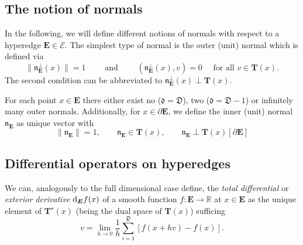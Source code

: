 \documentclass[a4paper, english, 12pt, reqno, draft]{amsart}
\theoremstyle{definition}
\theoremstyle{remark}
\numberwithin{equation}{section}
\newcommand{\SetEdge}{\ensuremath{\boldsymbol{\mathcal E}}}
\newcommand{\Edge}{{\ensuremath{\boldsymbol E}}}
\newcommand{\locDim}{\ensuremath{\mathfrak d}}
\newcommand{\globDim}{\ensuremath{\mathfrak D}}
\newcommand{\Der}{\ensuremath{\textup d_\Edge}}
\newcommand{\tangent}{\ensuremath{{\boldsymbol T}}}
\newcommand{\Normal}{\ensuremath{\mathfrak n_\Edge}}
\newcommand{\NormalOuter}{\ensuremath{\mathfrak n^\perp_\Edge}}
\newcommand{\IR}{\ensuremath{\mathbb R}}
\begin{document}
\subsection{The notion of normals}\label{SEC:normals}
% 
In the following, we will define different notions of normals with respect to a hyperedge $\Edge \in \SetEdge$. The simplest type of normal is the outer (unit) normal which is defined via
% 
\begin{equation*}
 \|\NormalOuter(x)\| = 1 \qquad \text{ and } \qquad (\NormalOuter(x), v) = 0 \quad \text{ for all } v \in \tangent(x).
\end{equation*}
% 
The second condition can be abbreviated to $\NormalOuter(x) \perp \tangent(x)$.

For each point $x \in \Edge$ there either exist no ($\locDim = \globDim$), two ($\locDim = \globDim - 1$) or infinitely many outer normals. Additionally, for $x \in \partial \Edge$, we define the inner (unit) normal $\Normal$ as unique vector with
%
\begin{equation*}
 \| \Normal \| = 1, \qquad \Normal \in \tangent(x), \qquad \Normal \perp \tangent(x) [\partial \Edge] 
\end{equation*}

% 
\subsection{Differential operators on hyperedges}\label{SEC:diff_op}
% 
We can, analogously to the full dimensional case define, the \emph{total differential} or \emph{exterior derivative} $\Der f(x)$ of a smooth function $f\colon \Edge \to \IR$ at $x \in \Edge$ as the unique element of $\tangent^\star (x)$ (being the dual space of $\tangent (x)$) sufficing
% 
\begin{equation*}
 [\Der f(x)] v = \lim_{h \to 0} \frac{1}{h} \sum_{i=1}^\globDim \left[ f(x + h v) - f(x) \right].
\end{equation*}
\end{document}
